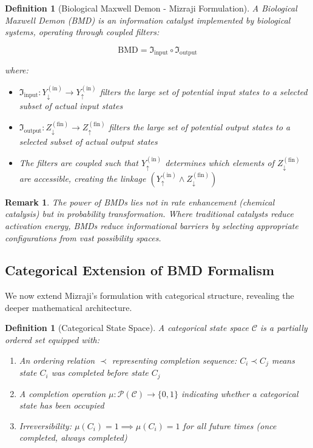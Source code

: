 \documentclass[12pt,a4paper]{article}
\newtheorem{definition}[theorem]{Definition}
\newtheorem{remark}[theorem]{Remark}
\begin{document}
\begin{definition}[Biological Maxwell Demon - Mizraji Formulation]
\label{def:bmd_mizraji}
A Biological Maxwell Demon (BMD) is an information catalyst implemented by biological systems, operating through coupled filters:

\begin{equation}
\text{BMD} = \Im_{\text{input}} \circ \Im_{\text{output}}
\end{equation}

where:
\begin{itemize}
\item $\Im_{\text{input}}: Y_{\downarrow}^{(\text{in})} \to Y_{\uparrow}^{(\text{in})}$ filters the large set of potential input states to a selected subset of actual input states
\item $\Im_{\text{output}}: Z_{\downarrow}^{(\text{fin})} \to Z_{\uparrow}^{(\text{fin})}$ filters the large set of potential output states to a selected subset of actual output states
\item The filters are coupled such that $Y_{\uparrow}^{(\text{in})}$ determines which elements of $Z_{\downarrow}^{(\text{fin})}$ are accessible, creating the linkage $(Y_{\uparrow}^{(\text{in})} \wedge Z_{\downarrow}^{(\text{fin})})$
\end{itemize}
\end{definition}

\begin{remark}
The power of BMDs lies not in rate enhancement (chemical catalysis) but in \textit{probability transformation}. Where traditional catalysts reduce activation energy, BMDs reduce \textit{informational barriers} by selecting appropriate configurations from vast possibility spaces.
\end{remark}

\subsection{Categorical Extension of BMD Formalism}

We now extend Mizraji's formulation with categorical structure, revealing the deeper mathematical architecture.

\begin{definition}[Categorical State Space]
\label{def:categorical_space}
A categorical state space $\mathcal{C}$ is a partially ordered set equipped with:
\begin{enumerate}
\item An ordering relation $\prec$ representing completion sequence: $C_i \prec C_j$ means state $C_i$ was completed before state $C_j$
\item A completion operation $\mu: \mathcal{P}(\mathcal{C}) \to \{0,1\}$ indicating whether a categorical state has been occupied
\item Irreversibility: $\mu(C_i) = 1 \implies \mu(C_i) = 1$ for all future times (once completed, always completed)
\end{enumerate}
\end{definition}
\end{document}
